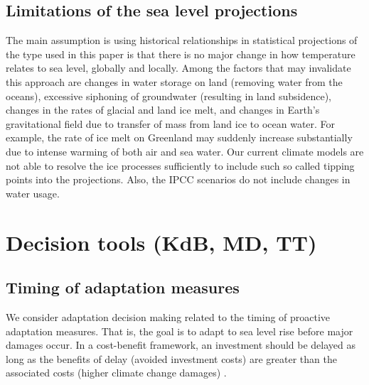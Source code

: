 \documentclass[wrr, draft]{agutex}
\begin{document}
\begin{article}
\subsection{Limitations of the sea level projections}
The main assumption is using historical relationships in statistical projections of the type used in this paper is that there is no major change in how temperature relates to sea level, globally and locally. Among the factors that may invalidate this approach are changes in water storage on land (removing water from the oceans), excessive siphoning of groundwater (resulting in land subsidence), changes in the rates of glacial and land ice melt, and changes in Earth's gravitational field due to transfer of mass from land ice to ocean water. For example, the rate of ice melt on Greenland may suddenly increase substantially due to intense warming of both air and sea water. Our current climate models are not able to resolve the ice processes sufficiently to include such so called tipping points into the projections. Also, the IPCC scenarios \citep{change} do not include changes in water usage.

\section{Decision tools {\color{blue} (KdB, MD, TT)}}

\subsection{Timing of adaptation measures}

We consider adaptation decision making related to the timing of proactive adaptation measures. That is, the goal is to adapt to sea level rise before major damages occur. In a cost-benefit framework, an investment should be delayed as long as the benefits of delay (avoided investment costs) are greater than the associated costs (higher climate change damages) \citep{Fankhauser&1999}.


\end{article}
\end{document}
